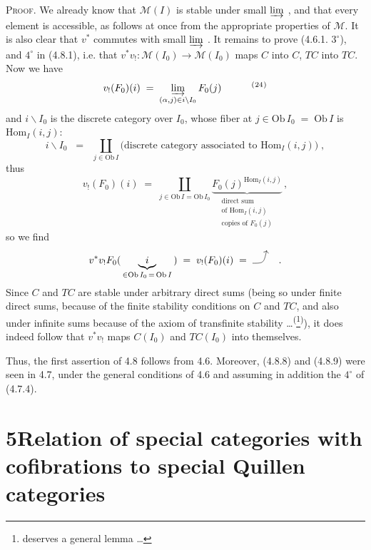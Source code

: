 \documentclass[11pt]{article}
\newcommand{\printedpage}[1]{\marginpar{\footnotesize p.~#1}}
\newcommand{\msp}[1]{\marginpar{\footnotesize [#1]}}
\newcommand{\fnm}[1]{\textsuperscript{(}\footnotemark[#1]\textsuperscript{)}}
\begin{document}
\textsc{Proof}. We already know that $\mathcal{M}(I)$ is stable under small $\varinjlim$ , and that every element is accessible, as follows at once from the appropriate properties of $\mathcal{M}$. It is also clear that $v^{*}$ commutes with small $\varinjlim$ . It remains to prove (4.6.1. $3^{\circ}$), and $4^{\circ}$ in (4.8.1), i.e. \msp{page 83} that $v^{*}v_{!} : \mathcal{M}(I_0) \longrightarrow \mathcal{M}(I_0)$ maps $C$ into $C$, $TC$ into $TC$. Now we have
\[
v_{!}(F_0)(i) \;=\; \varinjlim_{(\alpha,j)\in i\backslash I_0} F_0(j) \qquad\quad \text{\fnm{24}}
\]
and $i\backslash I_0$ is the discrete category over $I_0$, whose fiber at $j \in \mathrm{Ob}\, I_0 \;=\; \mathrm{Ob}\, I$ is $\mathrm{Hom}_I(i,j)$:
\[
i\backslash I_0 \;\;=\;\; \coprod_{j\in \mathrm{Ob}\, I} \text{(discrete category associated to $\mathrm{Hom}_I(i,j)$)} \; ,
\]
\printedpage{41}
thus
\[
v_{!}(F_0)(i) \;=\; \coprod_{j\in \mathrm{Ob}\, I = \mathrm{Ob}\, I_0} \underbrace{F_0(j)^{\mathrm{Hom}_I(i,j)}}_{\substack{\text{direct sum}\\ \text{of } \mathrm{Hom}_I(i,j)\\ \text{copies of } F_0(j)}} \, ,
\]
so we find
\[
v^{*}v_{!}F_0( \, \underbrace{\; i \;}_{\in \mathrm{Ob}\, I_0 \,=\, \mathrm{Ob}\, I} \, ) \;=\; v_{!}(F_0)(i) \;=\; \text{\tikz[baseline=0pt]\draw[->] (0,0) .. controls (0.4,0) .. (0.5,0.45);} \quad .
\]
Since $C$ and $TC$ are stable under arbitrary direct sums (being so under finite direct sums, because of the finite stability conditions on $C$ and $TC$, and also under infinite sums because of the axiom of transfinite stability \dots\textsuperscript{(}\footnote[25]{deserves a general lemma \dots}\textsuperscript{)}), it does indeed follow that $v^{*}v_{!}$ maps $C(I_0)$ and $TC(I_0)$ into themselves. %

Thus, the first assertion of 4.8 follows from 4.6. Moreover, (4.8.8) and (4.8.9) were seen in 4.7, under the general conditions of 4.6 and assuming in addition the $4^{\circ}$ of (4.7.4).

\msp{page 84}

\section*{5\quad Relation of special categories with cofibrations to special Quillen categories}
\end{document}
